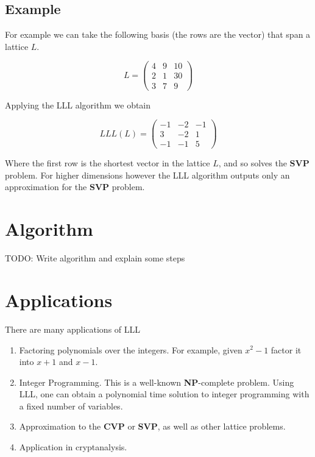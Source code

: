 \documentclass[a4paper,12pt]{report}
\begin{document}
\subsection*{Example}

For example we can take the following basis (the rows are the vector) that span
a lattice $L$.

\[
L = 
\begin{pmatrix}
    4 & 9 & 10\\
    2 & 1 & 30\\ 
    3 & 7 & 9
\end{pmatrix}
\] 

Applying the LLL algorithm we obtain

\[
LLL(L) = 
\begin{pmatrix}
    -1 & -2 & -1\\
     3 & -2 &  1\\
    -1 & -1 &  5
\end{pmatrix}
\] 

Where the first row is the shortest vector in the lattice $L$, and so solves the \textbf{SVP} problem.
For higher dimensions however the LLL algorithm outputs only an approximation for the \textbf{SVP} problem.

\section{Algorithm}

TODO: Write algorithm and explain some steps

\section{Applications}

There are many applications of LLL

\begin{enumerate}
    \item Factoring polynomials over the integers. For example, given $x^2 - 1$ factor it into $x + 1$ and $x - 1$.
    \item Integer Programming. This is a well-known \textbf{NP}-complete problem. Using LLL, one can obtain a polynomial time solution
          to integer programming with a fixed number of variables.
    \item Approximation to the \textbf{CVP} or \textbf{SVP}, as well as other lattice problems.
    \item Application in cryptanalysis.
\end{enumerate}
\end{document}
